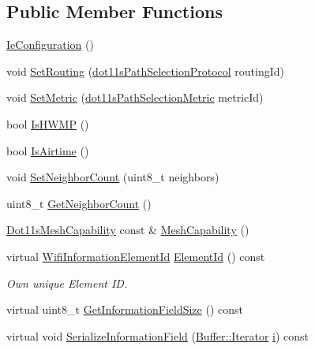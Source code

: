 \subsection*{Public Member Functions}
\begin{DoxyCompactItemize}
\item 
\hyperlink{classns3_1_1dot11s_1_1IeConfiguration_afb788ef4324baecf8a4240c387bb5784}{Ie\+Configuration} ()
\item 
void \hyperlink{classns3_1_1dot11s_1_1IeConfiguration_aa8c55658c3ff51868578de3b778c53d0}{Set\+Routing} (\hyperlink{namespacens3_1_1dot11s_a0d1bf7753c746323a05091844fc055f9}{dot11s\+Path\+Selection\+Protocol} routing\+Id)
\item 
void \hyperlink{classns3_1_1dot11s_1_1IeConfiguration_a1aa667b96a805082053303b7fa3c0010}{Set\+Metric} (\hyperlink{namespacens3_1_1dot11s_add870a70d1c8eef99d450ca9e0c51323}{dot11s\+Path\+Selection\+Metric} metric\+Id)
\item 
bool \hyperlink{classns3_1_1dot11s_1_1IeConfiguration_ad3abc82e100b76852f17cbd4055d4286}{Is\+H\+W\+MP} ()
\item 
bool \hyperlink{classns3_1_1dot11s_1_1IeConfiguration_af4b33b710cb0ad49df80055ee5736007}{Is\+Airtime} ()
\item 
void \hyperlink{classns3_1_1dot11s_1_1IeConfiguration_a001ab30e5eba1e25a3c998a64b87f824}{Set\+Neighbor\+Count} (uint8\+\_\+t neighbors)
\item 
uint8\+\_\+t \hyperlink{classns3_1_1dot11s_1_1IeConfiguration_ac3e7edb9492f87d38fd62cb7239de6d1}{Get\+Neighbor\+Count} ()
\item 
\hyperlink{classns3_1_1dot11s_1_1Dot11sMeshCapability}{Dot11s\+Mesh\+Capability} const \& \hyperlink{classns3_1_1dot11s_1_1IeConfiguration_ae82535c84f8d421e645f27243f8b643b}{Mesh\+Capability} ()
\item 
virtual \hyperlink{namespacens3_aeb185e0c8a60816016bca079f1420478}{Wifi\+Information\+Element\+Id} \hyperlink{classns3_1_1dot11s_1_1IeConfiguration_a5c6adb25a2f3a06c53e41cadec1d3509}{Element\+Id} () const 
\begin{DoxyCompactList}\small\item\em Own unique Element ID. \end{DoxyCompactList}\item 
virtual uint8\+\_\+t \hyperlink{classns3_1_1dot11s_1_1IeConfiguration_af48ea352cdd7044a8907e767f9a68500}{Get\+Information\+Field\+Size} () const 
\item 
virtual void \hyperlink{classns3_1_1dot11s_1_1IeConfiguration_afdfb82928ec50689bd74a5f8bc3a880f}{Serialize\+Information\+Field} (\hyperlink{classns3_1_1Buffer_1_1Iterator}{Buffer\+::\+Iterator} \hyperlink{lte__uplink__power__control_8m_a6f6ccfcf58b31cb6412107d9d5281426}{i}) const 

\end{DoxyCompactItemize}
